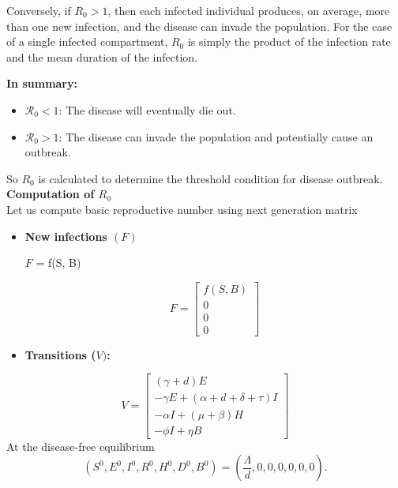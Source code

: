\documentclass[a4paper,12pt]{report}
\begin{document}
\begin{itemize}
 Conversely, if \(R_0 > 1\), then each infected individual produces, on average, more than one new infection, and the disease can invade the population. For the case of a single infected compartment, \(R_0 \) is simply the product of the infection rate and the mean duration of the
 infection.\\
 
 \vspace{0.2cm}

 
 \textbf{In summary:}
 \begin{itemize}
    \item \( \mathcal{R}_0 < 1 \): The disease will eventually die out.
    \item \( \mathcal{R}_0 > 1 \): The disease can invade the population and potentially cause an outbreak.
\end{itemize}


 
So $R_0$ is calculated to determine the threshold condition for disease outbreak.\\

\textbf{Computation of \(R_0\)}\\
Let us compute basic reproductive number using next generation matrix \\

\vspace{0.2cm}
\begin{itemize}
    \item \textbf{New infections \((F)\)}

\begin{center}
   \(F\) = f(S, B)

\end{center}

\[
F = \begin{bmatrix}
f(S, B) \\
0 \\
0 \\
0
\end{bmatrix}
\]
\item \textbf{Transitions (\(V)\):}
\end{itemize}


\[
V = \begin{bmatrix}
(\gamma + d)E \\
-\gamma E + (\alpha+d+\delta+\tau) I \\
-\alpha I +(\mu+\beta)H \\
-\phi I +\eta B
\end{bmatrix}
\]
At the disease-free equilibrium \[
(S^0, E^0, I^0, R^0, H^0, D^0, B^0) = \left( \frac{\Lambda}{d}, 0, 0, 0, 0, 0, 0 \right).
\]


\end{itemize}
\end{document}
